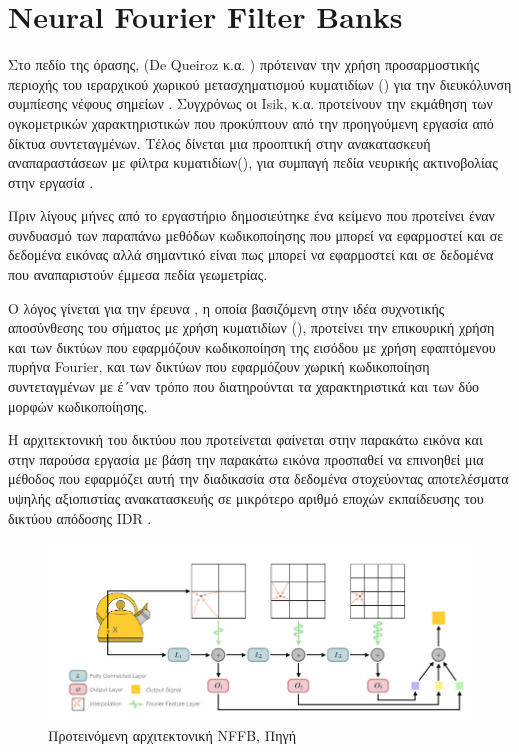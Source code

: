 \section{Neural Fourier Filter Banks}
\par 
    Στο πεδίο της  όρασης, (De Queiroz κ.α. \cite{de2016compression}) πρότειναν την χρήση προσαρμοστικής περιοχής του ιεραρχικού χωρικού μετασχηματισμού κυματιδίων () για την διευκόλυνση συμπίεσης νέφους σημείων . Συγχρόνως οι Ιsik, κ.α. \cite{isik2022lvac} προτείνουν την εκμάθηση των ογκομετρικών χαρακτηριστικών που προκύπτουν από την προηγούμενη εργασία από δίκτυα συντεταγμένων. Τέλος δίνεται μια προοπτική στην ανακατασκευή αναπαραστάσεων με φίλτρα κυματιδίων(), για συμπαγή πεδία νευρικής ακτινοβολίας στην εργασία \cite{Rho_2023_CVPR}.

\par
    Πριν λίγους μήνες από το εργαστήριο  δημοσιεύτηκε ένα κείμενο που προτείνει έναν συνδυασμό των παραπάνω μεθόδων κωδικοποίησης που μπορεί να εφαρμοστεί και σε δεδομένα εικόνας αλλά σημαντικό είναι πως μπορεί να εφαρμοστεί και σε δεδομένα που αναπαριστούν έμμεσα πεδία γεωμετρίας. 
\par 
    Ο λόγος γίνεται για την έρευνα  \cite{wu2023neural}, η οποία βασιζόμενη στην ιδέα συχνοτικής αποσύνθεσης του σήματος με χρήση κυματιδίων (), προτείνει την επικουρική χρήση και των δικτύων που εφαρμόζουν κωδικοποίηση της εισόδου με χρήση εφαπτόμενου πυρήνα Fourier, και των δικτύων που εφαρμόζουν χωρική κωδικοποίηση συντεταγμένων με έ´ναν τρόπο που διατηρούνται τα χαρακτηριστικά και των δύο μορφών κωδικοποίησης.
\par
    Η αρχιτεκτονική του δικτύου που προτείνεται φαίνεται στην παρακάτω εικόνα και στην παρούσα εργασία με βάση την παρακάτω εικόνα προσπαθεί να επινοηθεί μια μέθοδος που εφαρμόζει αυτή την διαδικασία στα δεδομένα στοχεύοντας αποτελέσματα υψηλής αξιοπιστίας ανακατασκευής σε μικρότερο αριθμό εποχών εκπαίδευσης του δικτύου απόδοσης IDR \cite{yariv2020multiview}.
\begin{figure}[H]
    \centering
    \includegraphics[width=.57\linewidth]{images/chapter3_img/nffb_og_architecture.jpg}
    \caption{Προτεινόμενη αρχιτεκτονική NFFB, Πηγή \cite{wu2023neural}}
    \label{fig:nffbogarchitecture}
\end{figure}
\clearpage